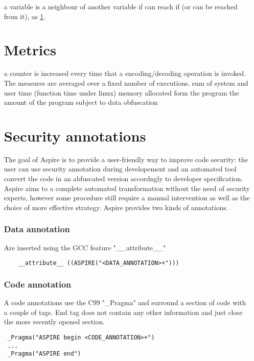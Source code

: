 	a variable is a neighbour of another variable if can reach if (or can be reached from it), as \ref{sec:metrics}.

\section{Metrics}\label{sec:metrics}
\begin{itemize}
	 a counter is increased every time that a encoding/decoding operation is invoked. The measures are averaged over a fixed number of executions.
	 sum of system and user time (function time under linux)
	 memory allocated form the program
	 the amount of the program subject to data obfuscation
\end{itemize}


\section{Security annotations} \cite{aspireD501}
The goal of Aspire is to provide a user-friendly way to improve code security: the user can use security annotation during developement and an automated tool convert the code in an abfuscated version accordngly to developer specification. Aspire aims to a complete automated transformation without the need of security experts, however some procedure still require a manual intervention as well as  the choice of more effective strategy.
Aspire provides two kinds of annotations.

\subsubsection{Data annotation}
Are inserted using the GCC feature "\_\_attribute\_\_" 
\begin{lstlisting}
	__attribute__ ((ASPIRE("<DATA_ANNOTATION>+")))
\end{lstlisting}

\subsubsection{Code annotation}
A code annotations use the C99 "\_Pragma" and surround a section of code with a couple of tags. End tag does not contain any other information and just close the more recently opened section.
\begin{lstlisting}
 _Pragma("ASPIRE begin <CODE_ANNOTATION>+")
 ...
 _Pragma("ASPIRE end")
\end{lstlisting} 

